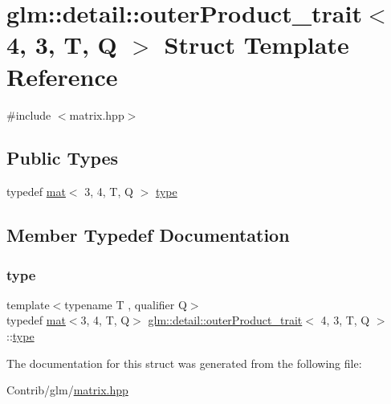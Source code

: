 \hypertarget{structglm_1_1detail_1_1outer_product__trait_3_014_00_013_00_01_t_00_01_q_01_4}{}\section{glm\+:\+:detail\+:\+:outer\+Product\+\_\+trait$<$ 4, 3, T, Q $>$ Struct Template Reference}
\label{structglm_1_1detail_1_1outer_product__trait_3_014_00_013_00_01_t_00_01_q_01_4}


{\ttfamily \#include $<$matrix.\+hpp$>$}

\subsection*{Public Types}
\begin{DoxyCompactItemize}
\item 
typedef \mbox{\hyperlink{structglm_1_1mat}{mat}}$<$ 3, 4, T, Q $>$ \mbox{\hyperlink{structglm_1_1detail_1_1outer_product__trait_3_014_00_013_00_01_t_00_01_q_01_4_ac976110a09c606311b8abe8cb48cb437}{type}}
\end{DoxyCompactItemize}


\subsection{Member Typedef Documentation}
\mbox{\label{structglm_1_1detail_1_1outer_product__trait_3_014_00_013_00_01_t_00_01_q_01_4_ac976110a09c606311b8abe8cb48cb437}} 
\subsubsection{\texorpdfstring{type}{type}}
{\footnotesize\ttfamily template$<$typename T , qualifier Q$>$ \\
typedef \mbox{\hyperlink{structglm_1_1mat}{mat}}$<$3, 4, T, Q$>$ \mbox{\hyperlink{structglm_1_1detail_1_1outer_product__trait}{glm\+::detail\+::outer\+Product\+\_\+trait}}$<$ 4, 3, T, Q $>$\+::\mbox{\hyperlink{structglm_1_1detail_1_1outer_product__trait_3_014_00_013_00_01_t_00_01_q_01_4_ac976110a09c606311b8abe8cb48cb437}{type}}}



The documentation for this struct was generated from the following file\+:\begin{DoxyCompactItemize}
\item 
Contrib/glm/\mbox{\hyperlink{matrix_8hpp}{matrix.\+hpp}}\end{DoxyCompactItemize}

